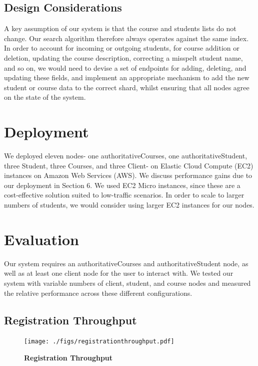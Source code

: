 \documentclass[sigplan, screen, 10pt]{acmart}
\begin{document}
\subsection{Design Considerations}
A key assumption of our system is that the course and students lists do not change. Our search algorithm therefore always operates against the same index. In order to account for incoming or outgoing students, for course addition or deletion, updating the course description, correcting a misspelt student name, and so on, we would need to devise a set of endpoints for adding, deleting, and updating these fields, and implement an appropriate mechanism to add the new student or course data to the correct shard, whilst ensuring that all nodes agree on the state of the system.

\section{Deployment}
We deployed eleven nodes- one authoritativeCourses, one authoritativeStudent, three Student, three Courses, and three Client- on Elastic Cloud Compute (EC2) instances on Amazon Web Services (AWS). We discuss performance gains due to our deployment in Section 6. We used EC2 Micro instances, since these are a cost-effective solution suited to low-traffic scenarios. In order to scale to larger numbers of students, we would consider using larger EC2 instances for our nodes.

\section{Evaluation}
Our system requires an authoritativeCourses and authoritativeStudent node, as well as at least one client node for the user to interact with. We tested our system with variable numbers of client, student, and course nodes and measured the relative performance across these different configurations.

\subsection{Registration Throughput}

\begin{figure}[!htb]
  \centering
  \texttt{[image: ./figs/registrationthroughput.pdf]}
  \caption{
    \textbf{Registration Throughput}
  }
\end{figure}
\end{document}
